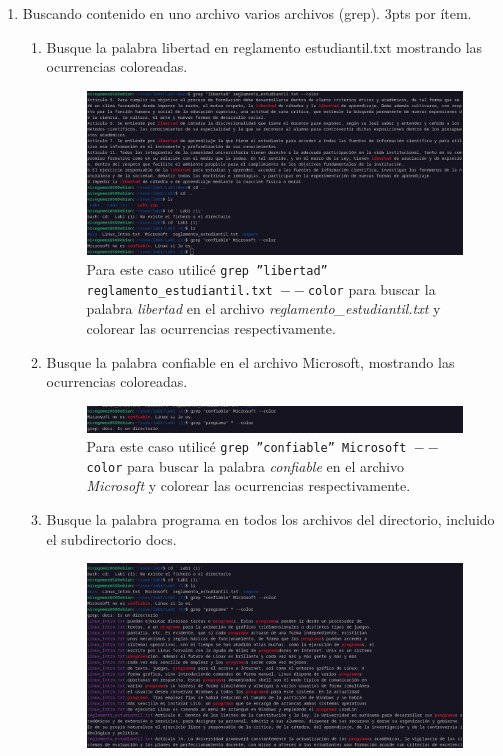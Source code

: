 \documentclass{templateNote}
\begin{document}
\begin{enumerate}
\begin{enumerate}[label=\alph*)]
\begin{figure}[H]
        \end{figure}
    \end{enumerate}
    \item Buscando contenido en uno archivo varios archivos (grep). 3pts por ítem.
    \begin{enumerate}[label=\alph*)]
        \item Busque la palabra libertad en reglamento estudiantil.txt mostrando las ocurrencias coloreadas.
        \begin{figure}[H]
            \centering
            \includegraphics[width=\textwidth]{img/ejerc4a.png}
            Para este caso utilicé \texttt{grep ''libertad'' reglamento\_estudiantil.txt $--$color} 
            para buscar la palabra \textit{libertad} en el archivo \textit{reglamento\_estudiantil.txt} 
            y colorear las ocurrencias respectivamente.
        \end{figure}
        \item Busque la palabra confiable en el archivo Microsoft, mostrando las ocurrencias coloreadas.
        \begin{figure}[H]
            \centering
            \includegraphics[width=\textwidth]{img/ejerc4b.png}
            Para este caso utilicé \texttt{grep ''confiable'' Microsoft $--$color} 
            para buscar la palabra \textit{confiable} en el archivo \textit{Microsoft} 
            y colorear las ocurrencias respectivamente.
        \end{figure}
        \item Busque la palabra programa en todos los archivos del directorio, incluido el subdirectorio docs.
        \begin{figure}[H]
            \centering
            \includegraphics[width=\textwidth]{img/ejerc4c.png}

\end{figure}
\end{enumerate}
\end{enumerate}
\end{document}
